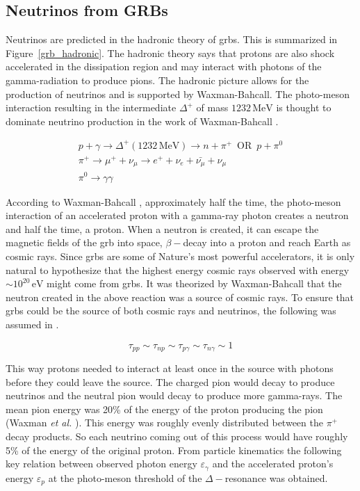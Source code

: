 \subsection{Neutrinos from GRBs}

Neutrinos are predicted in the hadronic theory of \gls{grbs}. This is summarized in Figure~\ref{grb_hadronic}.  
The hadronic theory says that protons are also shock accelerated in the dissipation region and may interact with photons of the gamma-radiation to produce pions. The hadronic picture allows for the production of neutrinos and is supported by Waxman-Bahcall. The photo-meson interaction resulting in the intermediate $\Delta^+$ of mass $1232 \, \mathrm{MeV}$ is thought to dominate neutrino production in the work of Waxman-Bahcall \cite{Waxmanreview,firstcalc,WBub,afterglows,ubrobust}.

\begin{gather*}
p+\gamma \longrightarrow \Delta^{+} (1232 \, \mathrm{MeV}) \longrightarrow n +\pi^{+} \,\,\, \mathrm{OR} \,\,\, p+\pi^{0}\\
\pi^{+} \longrightarrow \mu^{+} + \nu_{\mu} \longrightarrow e^{+} + \nu_{e} + \bar{\nu_{\mu}} + \nu_{\mu}\\
\pi^{0} \longrightarrow \gamma \gamma
\label{decays}
\end{gather*}

According to Waxman-Bahcall \cite{firstcalc}, approximately half the time, the photo-meson interaction of an accelerated proton with a gamma-ray photon creates a neutron and half the time, a proton. When a neutron is created, it can escape the magnetic fields of the \gls{grb} into space, $\beta-$decay into a proton and reach Earth as cosmic rays. Since \gls{grbs} are some of Nature's most powerful accelerators, it is only natural to hypothesize that the highest energy cosmic rays observed with energy $\sim 10^{20} \, \mathrm{eV}$ might come from \gls{grbs}. It was theorized by Waxman-Bahcall \cite{firstcalc,WBub,afterglows,ubrobust} that the neutron created in the above reaction was a source of cosmic rays. To ensure that \gls{grbs} could be the source of both cosmic rays and neutrinos, the following was assumed in \cite{WBub,ubrobust}.

\begin{equation*}
\tau_{pp}\sim \tau_{np} \sim \tau_{p \gamma} \sim \tau_{n \gamma} \sim 1
\end{equation*}  

This way protons needed to interact at least once in the source with photons before they could leave the source. The charged pion would decay to produce neutrinos and the neutral pion would decay to produce more gamma-rays. The mean pion energy was 20\% of the energy of the proton producing the pion (Waxman \textit{et al.} \cite{firstcalc}). This energy was roughly evenly distributed between the $\pi^{+}$ decay products. So each neutrino coming out of this process would have roughly 5\% of the energy of the original proton. From particle kinematics the following key relation between observed photon energy $\varepsilon_\gamma$ and the accelerated proton's energy $\varepsilon_p$ at the photo-meson threshold of the $\Delta-$resonance was obtained. 

